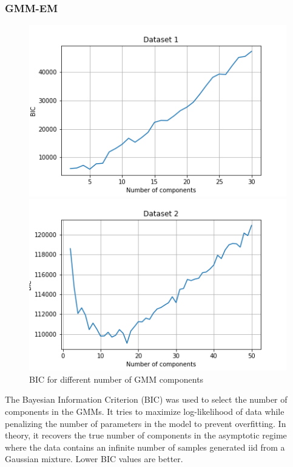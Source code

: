 \documentclass[letterpaper]{article}
\begin{document}
	\subsubsection{GMM-EM}
	\begin{figure}
		\centering
		\begin{minipage}{.5\textwidth}
			\centering
			\includegraphics[width=\linewidth]{../../plots/gmm_bic_1}
		\end{minipage}%
		\begin{minipage}{.5\textwidth}
			\centering
			\includegraphics[width=\linewidth]{../../plots/gmm_bic_2}
		\end{minipage}
		\caption{BIC for different number of GMM components}
		\label{fig:gmm_bic}
	\end{figure}

	The Bayesian Information Criterion (BIC) was used to select the number of components in the GMMs. It tries to maximize log-likelihood of data while penalizing the number of parameters in the model to prevent overfitting. In theory, it recovers the true number of components in the asymptotic regime where the data contains an infinite number of samples generated iid from a Gaussian mixture. Lower BIC values are better.
	
\end{document}

